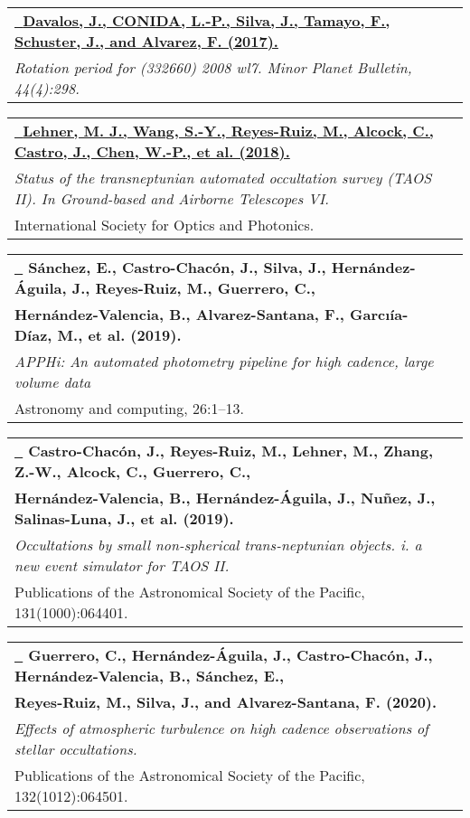 \documentclass[letterpaper,11pt]{article}
\makeatletter
\newcommand{\resumeProjectHeading}[2]{
    \item
    \begin{tabular*}{1.001\textwidth}{l@{\extracolsep{\fill}}r}
      \small#1 & \textbf{\small #2}\\
    \end{tabular*}\vspace{-7pt}
}
\makeatother
\begin{document}
      \resumeProjectHeading
          {\textbf{\href{https://ui.adsabs.harvard.edu/abs/2017MPBu...44..298D/abstract}{\raisebox{-0.2\height}\faFilePdf\ \textbf{Davalos, J., CONIDA, L.-P., Silva, J., Tamayo, F., Schuster, J., and Alvarez, F. (2017).}}} \\ \emph{Rotation period for (332660) 2008 wl7. Minor Planet Bulletin, 44(4):298.}}{}
      \resumeProjectHeading
          {\textbf{\href{https://www.spiedigitallibrary.org/conference-proceedings-of-spie/10700/2309584/Status-of-the-Transneptunian-Automated-Occultation-Survey-TAOS-II/10.1117/12.2309584.short?SSO=1}{\raisebox{-0.2\height}\faFilePdf\ \textbf{Lehner, M. J., Wang, S.-Y., Reyes-Ruiz, M., Alcock, C., Castro, J., Chen, W.-P., et al. (2018).}}} \\ \emph{Status of the transneptunian automated occultation survey (TAOS II). In
          Ground-based and Airborne Telescopes VI.} \\ {International Society for Optics and Photonics.}}{}
      \resumeProjectHeading
          {\textbf{\href{https://www.sciencedirect.com/science/article/abs/pii/S2213133718300465}{\raisebox{-0.2\height}\faFilePdf\  } \textbf{Sánchez, E., Castro-Chacón, J., Silva, J., Hernández-Águila, J., Reyes-Ruiz, M., Guerrero, C.,}} \\ \textbf{Hernández-Valencia,
          B., Alvarez-Santana, F., Garcıía-Díaz, M., et al. (2019).} \\ \emph{APPHi: An automated photometry pipeline for high cadence, large volume data} \\ {Astronomy and computing, 26:1–13.}}{}
      \resumeProjectHeading
          {\textbf{\href{https://iopscience.iop.org/article/10.1088/1538-3873/ab152e/meta}{\raisebox{-0.2\height}\faFilePdf\  } \textbf{Castro-Chacón, J., Reyes-Ruiz, M., Lehner, M., Zhang, Z.-W., Alcock, C., Guerrero, C., }} \\ \textbf{Hernández-Valencia, B., Hernández-Águila, J., Nuñez, J., Salinas-Luna, J., et al. (2019).} \\ \emph{Occultations by small non-spherical trans-neptunian objects. i. a new event simulator for TAOS II.} \\ {Publications of the Astronomical Society of the Pacific, 131(1000):064401.}}{}
      \resumeProjectHeading
          {\textbf{\href{https://iopscience.iop.org/article/10.1088/1538-3873/ab8564}{\raisebox{-0.2\height}\faFilePdf\  } \textbf{Guerrero, C., Hernández-Águila, J., Castro-Chacón, J., Hernández-Valencia, B., Sánchez, E.,}} \\ \textbf{Reyes-Ruiz, M., Silva,
          J., and Alvarez-Santana, F. (2020).} \\ \emph{Effects of atmospheric turbulence on high cadence observations of stellar occultations.} \\ {Publications of the Astronomical Society of the Pacific, 132(1012):064501.}}{}
\end{document}
